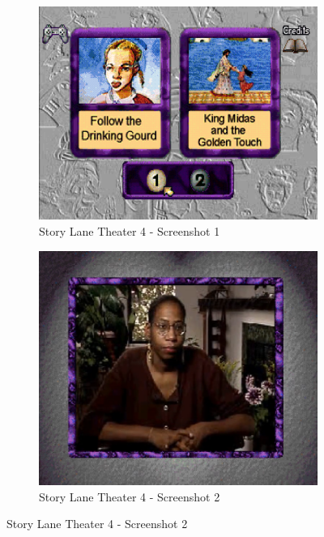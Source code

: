 \begin{figure}[H]
    \centering
    \begin{subfigure}{0.45\textwidth}
        \centering
        \includegraphics[width=\linewidth]{Games/StoryLaneTheater/Images/StoryLaneTheater4Image1.png}
        \caption{Story Lane Theater 4 - Screenshot 1}
    \end{subfigure}
    \begin{subfigure}{0.45\textwidth}
        \includegraphics[width=\linewidth]{Games/StoryLaneTheater/Images/StoryLaneTheater4Image2.png}
        \caption{Story Lane Theater 4 - Screenshot 2}
    \end{subfigure}


\end{figure}
